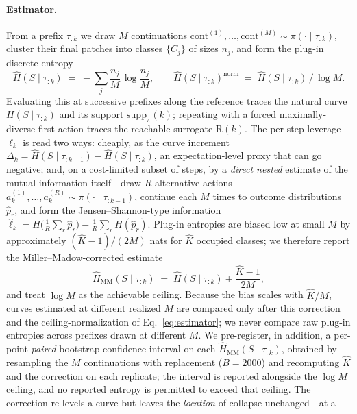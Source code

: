 \documentclass[11pt]{article}
\newcommand{\Hk}{\widehat{H}\!\left(S \mid \tau_{:k}\right)}
\newcommand{\strat}{S}
\newcommand{\prefix}{\tau_{:k}}
\begin{document}
\paragraph{Estimator.}
From a prefix $\prefix$ we draw $M$ continuations
$\text{cont}^{(1)},\dots,\text{cont}^{(M)}\sim\pi(\cdot\mid\prefix)$, cluster their
final patches into classes $\{C_j\}$ of sizes $n_j$, and form the plug-in discrete
entropy
\begin{equation}
\Hk \;=\; -\sum_j \frac{n_j}{M}\,\log\frac{n_j}{M}, \qquad
\Hk^{\text{norm}} \;=\; \Hk\,/\,\log M .
\label{eq:estimator}
\end{equation}
Evaluating this at successive prefixes along the reference traces the natural curve
$H(\strat\mid\tau_{:k})$ and its support $\mathrm{supp}_\pi(k)$; repeating with a
forced maximally-diverse first action traces the reachable surrogate
$\mathrm{R}(k)$. The per-step leverage $\ell_k$ is read two ways: cheaply, as the
curve increment $\Delta_k=\widehat H(\strat\mid\tau_{:k-1})-\widehat
H(\strat\mid\tau_{:k})$, an expectation-level proxy that can go negative; and, on a
cost-limited subset of steps, by a \emph{direct nested} estimate of the mutual
information itself---draw $R$ alternative actions
$a_k^{(1)},\dots,a_k^{(R)}\sim\pi(\cdot\mid\tau_{:k-1})$, continue each $M$ times to
outcome distributions $\hat p_r$, and form the Jensen--Shannon-type information
$\widehat\ell_k = H\!\big(\tfrac1R\textstyle\sum_r \hat p_r\big)-\tfrac1R\sum_r
H(\hat p_r)$. Plug-in entropies are biased low at small $M$ by approximately
$(\hat K-1)/(2M)$ nats for $\hat K$ occupied classes; we therefore report the
Miller--Madow-corrected estimate
\begin{equation}
\widehat H_{\mathrm{MM}}(\strat\mid\prefix)\;=\;\Hk+\frac{\hat K-1}{2M},
\label{eq:mm}
\end{equation}
and treat $\log M$ as the achievable ceiling. Because the bias scales with
$\hat K/M$, curves estimated at different realized $M$ are compared only after this
correction and the ceiling-normalization of Eq.~\eqref{eq:estimator}; we never
compare raw plug-in entropies across prefixes drawn at different $M$. We
pre-register, in addition, a per-point \emph{paired} bootstrap confidence interval
on each $\widehat H_{\mathrm{MM}}(\strat\mid\prefix)$, obtained by resampling the
$M$ continuations with replacement ($B=2000$) and recomputing $\hat K$ and the
correction on each replicate; the interval is reported alongside the $\log M$
ceiling, and no reported entropy is permitted to exceed that ceiling. The correction
re-levels a curve but leaves the \emph{location} of collapse unchanged---at a
\end{document}
